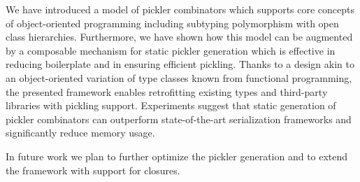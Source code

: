 We have introduced a model of pickler combinators which supports core
concepts of object-oriented programming including subtyping polymorphism
with open class hierarchies. Furthermore, we have shown how this model
can be augmented by a composable mechanism for static pickler
generation which is effective in reducing boilerplate and in ensuring
efficient pickling. Thanks to a design akin to an object-oriented
variation of type classes known from functional programming, the
presented framework enables retrofitting existing types and
third-party libraries with pickling support. Experiments suggest that
static generation of pickler combinators can outperform
state-of-the-art serialization frameworks and significantly reduce
memory usage.

In future work we plan to further optimize the pickler generation and
to extend the framework with support for closures.
